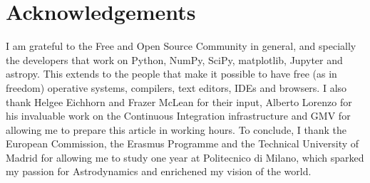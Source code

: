 \section{Acknowledgements}

I am grateful to the Free and Open Source Community in general, and specially the developers that work on Python, NumPy, SciPy, matplotlib, Jupyter and astropy. This extends to the people that make it possible to have free (as in freedom) operative systems, compilers, text editors, IDEs and browsers. I also thank Helgee Eichhorn and Frazer McLean for their input, Alberto Lorenzo for his invaluable work on the Continuous Integration infrastructure and GMV for allowing me to prepare this article in working hours. To conclude, I thank the European Commission, the Erasmus Programme and the Technical University of Madrid for allowing me to study one year at Politecnico di Milano, which sparked my passion for Astrodynamics and enrichened my vision of the world.